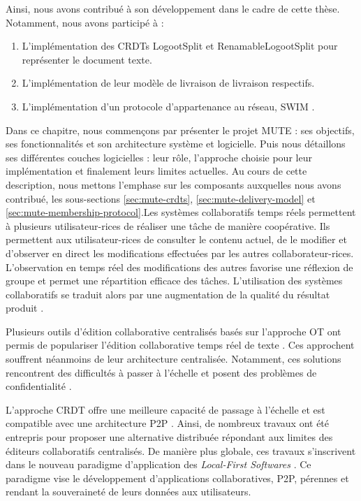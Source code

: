 Ainsi, nous avons contribué à son développement dans le cadre de cette thèse.
Notamment, nous avons participé à :
\begin{enumerate}
  \item L'implémentation des \acp{CRDT} LogootSplit \cite{2013-logootsplit} et RenamableLogootSplit \cite{2022-rls-tpds-nicolas} pour représenter le document texte.
  \item L'implémentation de leur modèle de livraison de livraison respectifs.
  \item L'implémentation d'un protocole d'appartenance au réseau, SWIM \cite{swim2002}.
\end{enumerate}

Dans ce chapitre, nous commençons par présenter le projet \ac{MUTE} : ses objectifs, ses fonctionnalités et son architecture système et logicielle.
Puis nous détaillons ses différentes couches logicielles : leur rôle, l'approche choisie pour leur implémentation et finalement leurs limites actuelles.
Au cours de cette description, nous mettons l'emphase sur les composants auxquelles nous avons contribué, \ie les sous-sections \ref{sec:mute-crdts}, \ref{sec:mute-delivery-model} et \ref{sec:mute-membership-protocol}.Les systèmes collaboratifs temps réels permettent à plusieurs utilisateur-rices de réaliser une tâche de manière coopérative.
Ils permettent aux utilisateur-rices de consulter le contenu actuel, de le modifier et d'observer en direct les modifications effectuées par les autres collaborateur-rices.
L'observation en temps réel des modifications des autres favorise une réflexion de groupe et permet une répartition efficace des tâches.
L'utilisation des systèmes collaboratifs se traduit alors par une augmentation de la qualité du résultat produit \cite{2004-empirical-study-collaborative-writing, 2005-internet-encyclopaedias-head-to-head}.

Plusieurs outils d'édition collaborative centralisés basés sur l'approche \ac{OT} \cite{1989-grove-ellis-gibbs} ont permis de populariser l'édition collaborative temps réel de texte \cite{gdocs, etherpad}.
Ces approchent souffrent néanmoins de leur architecture centralisée.
Notamment, ces solutions rencontrent des difficultés à passer à l'échelle \cite{2015-cope-delay-collaborative-note-taking-ignat, 2016-performance-collaborative-editors-dang-ignat} et posent des problèmes de confidentialité \cite{prism-washington-post, prism-guardian}.

L'approche \ac{CRDT} offre une meilleure capacité de passage à l'échelle et est compatible avec une architecture \ac{P2P} \cite{2011-evaluation-crdts-ahmed-nacer}.
Ainsi, de nombreux travaux \cite{Nedelec2016CRATE, peerpad, serenity-notes} ont été entrepris pour proposer une alternative distribuée répondant aux limites des éditeurs collaboratifs centralisés.
De manière plus globale, ces travaux s'inscrivent dans le nouveau paradigme d'application des \emph{Local-First Softwares} \cite{localfirstsoftware2019, pushpin2020}.
Ce paradigme vise le développement d'applications collaboratives, \ac{P2P}, pérennes et rendant la souveraineté de leurs données aux utilisateurs.\\


